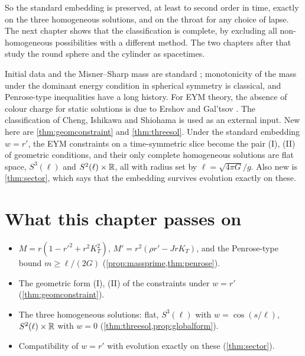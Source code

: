 So the standard embedding is preserved, at least to second order in time, exactly on the three homogeneous solutions, and on the throat for any choice of lapse. The next chapter shows that the classification is complete, by excluding all non-homogeneous possibilities with a different method. The two chapters after that study the round sphere and the cylinder as spacetimes.

\begin{litbox}
Initial data and the Misner--Sharp mass are standard \cite{MisnerSharp1964,PoissonToolkit}; monotonicity of the mass under the dominant energy condition in spherical symmetry is classical, and Penrose-type inequalities have a long history. For EYM theory, the absence of colour charge for static solutions is due to Ershov and Gal'tsov \cite{VolkovGaltsov1999}. The classification of Cheng, Ishikawa and Shiohama \cite{CIS1999} is used as an external input. New here are \cref{thm:geomconstraint} and \cref{thm:threesol}. Under the standard embedding $w=r'$, the EYM constraints on a time-symmetric slice become the pair (I), (II) of geometric conditions, and their only complete homogeneous solutions are flat space, $S^3(\ell)$ and $S^2(\ell)\times\mathbb{R}$, all with radius set by $\ell=\sqrt{4\pi G}/g$. Also new is \cref{thm:sector}, which says that the embedding survives evolution exactly on these.
\end{litbox}

\section*{What this chapter passes on}
\begin{itemize}[nosep]
\item $M=r(1-r'^2+r^2K_T^2)$, $M'=r^2(\rho r'-JrK_T)$, and the Penrose-type bound $m\ge\ell/(2G)$ (\cref{prop:massprime,thm:penrose}).
\item The geometric form (I), (II) of the constraints under $w=r'$ (\cref{thm:geomconstraint}).
\item The three homogeneous solutions: flat, $S^3(\ell)$ with $w=\cos(s/\ell)$, $S^2(\ell)\times\mathbb{R}$ with $w=0$ (\cref{thm:threesol,prop:globalform}).
\item Compatibility of $w=r'$ with evolution exactly on these (\cref{thm:sector}).
\end{itemize}

